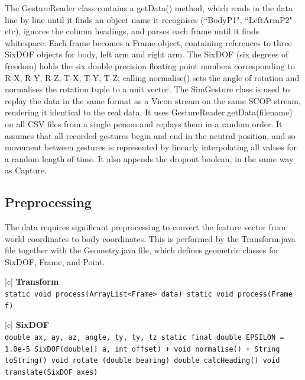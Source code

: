 \documentclass[12pt,a4,notitlepage]{report}
\renewcommand{\_}{\texttt{\symbol{95}}}
\newcommand{\<}{\texttt{\symbol{60}}}
\renewcommand{\>}{\texttt{\symbol{62}}}
\newcommand{\class}[1]{\textbf{#1}}
\newcommand{\variable}[1]{\texttt{#1}}
\begin{document}
The GestureReader class contains a getData() method, which reads in the data line by line until it finds an object name it recognises (``BodyP1", ``LeftArmP2" etc), ignores the column headings, and parses each frame until it finds whitespace. Each frame becomes a Frame object, containing references to three SixDOF objects for body, left arm and right arm. The SixDOF (six degrees of freedom) holds the six double precision floating point numbers corresponding to \<R-X\>, \<R-Y\>, \<R-Z\>, \<T-X\>, \<T-Y\>, \<T-Z\>; calling normalise() sets the angle of rotation and normalises the rotation tuple to a unit vector.
The SimGesture class is used to replay the data in the same format as a Vicon stream on the same SCOP stream, rendering it identical to the real data. It uses  GestureReader.getData(filename) on all CSV files from a single person and replays them in a random order. It assumes that all recorded gestures begin and end in the neutral position, and so movement between gestures is represented by linearly interpolating all values for a random length of time. It also appends the dropout boolean, in the same way as Capture.

\subsection{Preprocessing}

The data requires significant preprocessing to convert the feature vector from world coordinates to body coordinates. This is performed by the Transform.java file together with the Geometry.java file, which defines geometric classes for SixDOF, Frame, and Point.

\begin{tabular}{|c|} \hline 
\class{Transform} \\ \hline
{}
{ \variable{static void process(ArrayList<Frame> data) \newline
static void process(Frame f)
} } \\ \hline
\end{tabular}

\begin{tabular}{|c|} \hline 
\class{SixDOF} \\ \hline
{}
{\variable{double ax, ay, az, angle, ty, ty, tz \newline
  static final double EPSILON = 1.0e-5 \newline
  SixDOF(double[] a, int offset) \newline
  + void normalise() \newline
  + String toString() \newline
  void rotate (double bearing) \newline
  double calcHeading() \newline
  void translate(SixDOF axes)
} } \\ \hline
\end{tabular}
\end{document}
